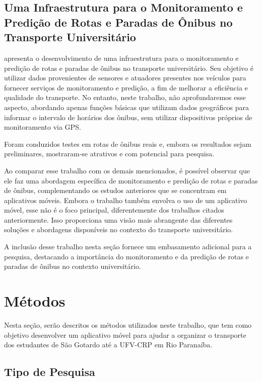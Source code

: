 \documentclass[
    12pt,                   %
    openright,              %
    oneside,                %
    a4paper,                %
    sumario=tradicional,    %
    english,                %
    brazil,                 %
    ]{abntex2}
\begin{document}
\section{Uma Infraestrutura para o Monitoramento e Predição de Rotas e Paradas de Ônibus no Transporte
Universitário}
\label{sec:infraestruturamiranda2019}

\cite{miranda2019infraestrutura} apresenta o desenvolvimento de uma infraestrutura para o monitoramento e predição de rotas e paradas de ônibus no transporte universitário. Seu objetivo é utilizar dados provenientes de sensores e atuadores presentes nos veículos para fornecer serviços de monitoramento e predição, a fim de melhorar a eficiência e qualidade do transporte. No entanto, neste trabalho, não aprofundaremos esse aspecto, abordando apenas funções básicas que utilizam dados geográficos para informar o intervalo de horários dos ônibus, sem utilizar dispositivos próprios de monitoramento via GPS.

Foram conduzidos testes em rotas de ônibus reais e, embora os resultados sejam preliminares, mostraram-se atrativos e com potencial para pesquisa.

Ao comparar esse trabalho com os demais mencionados, é possível observar que ele faz uma abordagem específica de monitoramento e predição de rotas e paradas de ônibus, complementando os estudos anteriores que se concentram em aplicativos móveis. Embora o trabalho também envolva o uso de um aplicativo móvel, esse não é o foco principal, diferentemente dos trabalhos citados anteriormente. Isso proporciona uma visão mais abrangente das diferentes soluções e abordagens disponíveis no contexto do transporte universitário.

A inclusão desse trabalho nesta seção fornece um embasamento adicional para a pesquisa, destacando a importância do monitoramento e da predição de rotas e paradas de ônibus no contexto universitário.

\chapter{Métodos}\label{sec:metodos}

Nesta seção, serão descritos os métodos utilizados neste trabalho, que tem como objetivo desenvolver um aplicativo móvel para ajudar a organizar o transporte dos estudantes de São Gotardo até a UFV-CRP em Rio Paranaíba.

\section{Tipo de Pesquisa}
\end{document}
